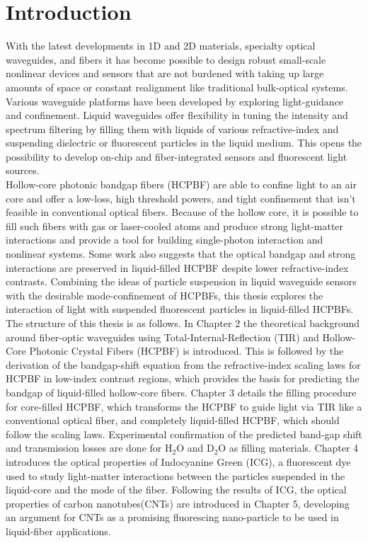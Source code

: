 \chapter{Introduction}
With the latest developments in 1D and 2D materials, specialty optical waveguides, and fibers it has become possible to design robust small-scale nonlinear devices and sensors\cite{cusano,yamashita.tutorial} that are not burdened with taking up large amounts of space or constant realignment like traditional bulk-optical systems.
Various waveguide platforms have been developed by exploring light-guidance and confinement.
Liquid waveguides offer flexibility in tuning the intensity and spectrum filtering by filling them with liquids of various refractive-index and suspending dielectric or fluorescent particles in the liquid medium\cite{conroy, bliss, vezenov}.
This opens the possibility to develop on-chip and fiber-integrated sensors and fluorescent light sources.\\
Hollow-core photonic bandgap fibers (HCPBF) are able to confine light to an air core and offer a low-loss, high threshold powers, and tight confinement that isn't feasible in conventional optical fibers.
Because of the hollow core, it is possible to fill such fibers with gas or laser-cooled atoms and produce strong light-matter interactions\cite{bajcsy, hilton} and provide a tool for building single-photon interaction and nonlinear systems.
Some work also suggests that the optical bandgap and strong interactions are preserved in liquid-filled HCPBF \cite{antonopoulos} despite lower refractive-index contrasts.
Combining the ideas of particle suspension in liquid waveguide sensors with the desirable mode-confinement of HCPBFs, this thesis explores the interaction of light with suspended fluorescent particles in liquid-filled HCPBFs.\\ 

The structure of this thesis is as follows. In Chapter 2 the theoretical background around fiber-optic waveguides using Total-Internal-Reflection (TIR) and Hollow-Core Photonic Crystal Fibers (HCPBF) is introduced. This is followed by the derivation of the bandgap-shift equation from the refractive-index scaling laws for HCPBF in low-index contrast regions, which provides the basis for predicting the bandgap of liquid-filled hollow-core fibers.
Chapter 3 details the filling procedure for core-filled HCPBF, which transforms the HCPBF to guide light via TIR like a conventional optical fiber, and completely liquid-filled HCPBF, which should follow the scaling laws. Experimental confirmation of the predicted band-gap shift and transmission losses are done for H${}_2$O and D${}_2$O as filling materials. Chapter 4 introduces the optical properties of Indocyanine Green (ICG), a fluorescent dye used to study light-matter interactions between the particles suspended in the liquid-core and the mode of the fiber. Following the results of ICG, the optical properties of carbon nanotubes(CNTs) are introduced in Chapter 5, developing an argument for CNTs as a promising fluorescing nano-particle to be used in liquid-fiber applications. 